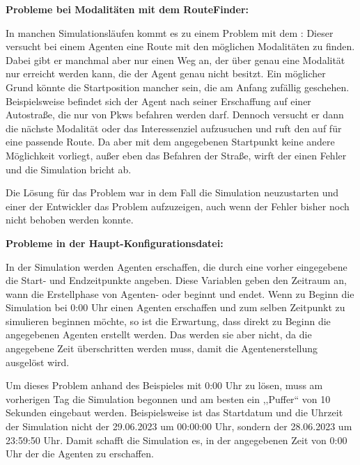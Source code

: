\textbf{Probleme bei Modalitäten mit dem RouteFinder:}

In manchen Simulationsläufen kommt es zu einem Problem mit dem : Dieser versucht bei einem Agenten eine Route mit den möglichen Modalitäten zu finden.
Dabei gibt er manchmal aber nur einen Weg an, der über genau eine Modalität nur erreicht werden kann, die der Agent genau nicht besitzt.
Ein möglicher Grund könnte die Startposition mancher  sein, die am Anfang zufällig geschehen.
Beispielsweise befindet sich der Agent nach seiner Erschaffung auf einer Autostraße, die nur von Pkws befahren werden darf.
Dennoch versucht er dann die nächste Modalität oder das Interessenziel aufzusuchen und ruft den  auf für eine passende Route.
Da aber mit dem angegebenen Startpunkt keine andere Möglichkeit vorliegt, außer eben das Befahren der Straße, wirft der  einen Fehler und die Simulation bricht ab.

Die Lösung für das Problem war in dem Fall die Simulation neuzustarten und einer der Entwickler das Problem aufzuzeigen, auch wenn der Fehler bisher noch nicht behoben werden konnte.

\textbf{Probleme in der Haupt-Konfigurationsdatei:}

In der Simulation werden Agenten erschaffen, die durch eine vorher eingegebene  die Start- und Endzeitpunkte angeben.
Diese Variablen geben den Zeitraum an, wann die Erstellphase von Agenten- oder beginnt und endet.
Wenn zu Beginn die Simulation bei 0:00 Uhr einen Agenten erschaffen und zum selben Zeitpunkt zu simulieren beginnen möchte, so ist die Erwartung, dass direkt zu Beginn die angegebenen Agenten erstellt werden.
Das werden sie aber nicht, da die angegebene Zeit überschritten werden muss, damit die Agentenerstellung ausgelöst wird.

Um dieses Problem anhand des Beispieles mit 0:00 Uhr zu lösen, muss am vorherigen Tag die Simulation begonnen und am besten ein ,,Puffer`` von 10 Sekunden eingebaut werden.
Beispielsweise ist das Startdatum und die Uhrzeit der Simulation nicht der 29.06.2023 um 00:00:00 Uhr, sondern der 28.06.2023 um 23:59:50 Uhr.
Damit schafft die Simulation es, in der angegebenen Zeit von 0:00 Uhr der  die Agenten zu erschaffen.
